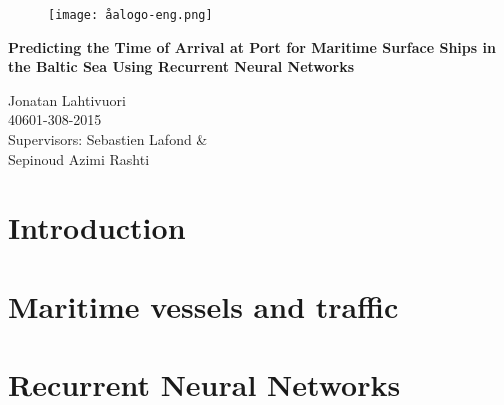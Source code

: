 \documentclass[12pt]{article}
\begin{document}
\begin{titlepage}
\vspace*{20mm}
\begin{figure}[h]
\centering
\texttt{[image: åalogo-eng.png]}
\end{figure}
\begin{center}
	\Huge\textbf{Predicting the Time of Arrival at Port for Maritime Surface Ships in the Baltic Sea Using Recurrent Neural Networks}
\end{center}
\vfill
\begin{flushright}
Jonatan Lahtivuori\\
40601-308-2015\\
Supervisors: Sebastien Lafond \&\\ Sepinoud Azimi Rashti
\end{flushright}
\end{titlepage}




\newpage
\tableofcontents

\newpage
{} %
\section{Introduction}


\newpage
\section{Maritime vessels and traffic}


\newpage
\section{Recurrent Neural Networks}

\end{document}

